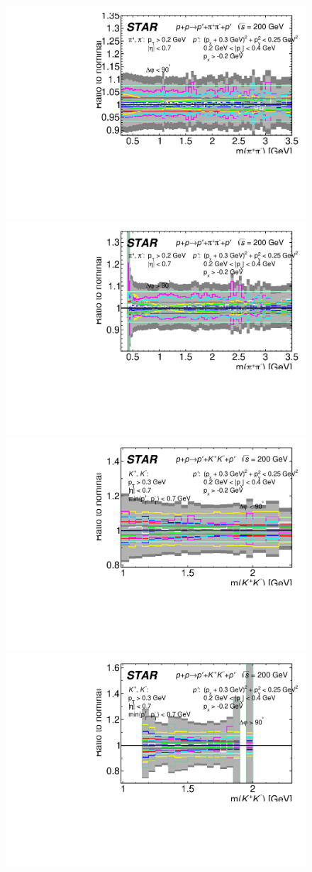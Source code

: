 %
\begin{figure}[h]
\centering
\hspace*{5pt}
\includegraphics[width=.46\textwidth,page=1]{graphics/systematics/FinalResult_InvMass_DeltaPhiBin1_pion_Systematics2.pdf}
\hfill
\includegraphics[width=.46\textwidth,page=1]{graphics/systematics/FinalResult_InvMass_DeltaPhiBin2_pion_Systematics2.pdf}
\hspace*{5pt}
\newline
\hspace*{5pt}
\includegraphics[width=.46\textwidth,page=1]{graphics/systematics/FinalResult_InvMass_DeltaPhiBin1_kaon_Systematics2.pdf}
\hfill
\includegraphics[width=.46\textwidth,page=1]{graphics/systematics/FinalResult_InvMass_DeltaPhiBin2_kaon_Systematics2.pdf}
\hspace*{5pt}

\end{figure}
